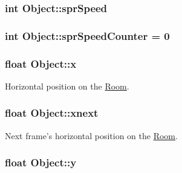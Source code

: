 \hypertarget{class_object_ab66e9611429a7f5a0f0889332514e607}{
\subsubsection[{spr\-Speed}]{\setlength{\rightskip}{0pt plus 5cm}int Object\-::spr\-Speed\hspace{0.3cm}{\ttfamily [protected]}}}\label{class_object_ab66e9611429a7f5a0f0889332514e607}
\hypertarget{class_object_aa16902b53e4e950380464c71f0b9554b}{
\subsubsection[{spr\-Speed\-Counter}]{\setlength{\rightskip}{0pt plus 5cm}int Object\-::spr\-Speed\-Counter = 0\hspace{0.3cm}{\ttfamily [protected]}}}\label{class_object_aa16902b53e4e950380464c71f0b9554b}
\hypertarget{class_object_a99addca3b5d96c214fa8f90474224699}{
\subsubsection[{x}]{\setlength{\rightskip}{0pt plus 5cm}float Object\-::x}}\label{class_object_a99addca3b5d96c214fa8f90474224699}


Horizontal position on the \hyperlink{class_room}{Room}. 

\hypertarget{class_object_adf988f967e46c4fd5d3276778d83b51c}{
\subsubsection[{xnext}]{\setlength{\rightskip}{0pt plus 5cm}float Object\-::xnext\hspace{0.3cm}{\ttfamily [protected]}}}\label{class_object_adf988f967e46c4fd5d3276778d83b51c}


Next frame's horizontal position on the \hyperlink{class_room}{Room}. 

\hypertarget{class_object_a2870044ec214e97550ee28db89c6382a}{
\subsubsection[{y}]{\setlength{\rightskip}{0pt plus 5cm}float Object\-::y}}\label{class_object_a2870044ec214e97550ee28db89c6382a}


